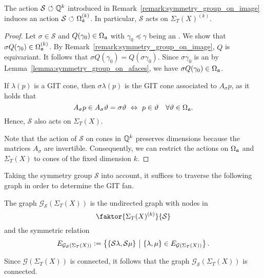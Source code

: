 \begin{prop}
	\label{proposition:symmetry_group_on_orbit_cones}
	The action $\mathcal{S}{\ \circlearrowleft\ }\mathbb{Q}^k$ introduced in Remark~\ref{remark:symmetry_group_on_image} induces an action $\mathcal{S}{\ \circlearrowleft\ }\Omega_{\mathfrak{a}}^{(k)}$. In particular, $\mathcal{S}$ acts on $\Sigma_T(X)^{(k)}$.
\end{prop}
\begin{proof}
	Let $\sigma\in\mathcal{S}$ and $Q(\gamma_0)\in\Omega_{\mathfrak{a}}$ with $\gamma_0\preceq\gamma$ being an \aface{}. We show that $\sigma Q(\gamma_0)\in\Omega_{\mathfrak{a}}^{(k)}$. By Remark~\ref{remark:symmetry_group_on_image}, $Q$ is equivariant. It follows that $\sigma Q(\gamma_0) = Q(\sigma\gamma_0)$. Since $\sigma\gamma_0$ is an \aface{} by Lemma~\ref{lemma:symmetry_group_on_afaces}, we have $\sigma Q(\gamma_0)\in\Omega_{\mathfrak{a}}$.
	
	If $\lambda(p)$ is a GIT cone, then $\sigma \lambda(p)$ is the GIT cone associated to $A_\sigma p$, as it holds that
	$$A_\sigma p \in A_\sigma \vartheta = \sigma \vartheta \ \Leftrightarrow\ p\in \vartheta\quad \forall \vartheta\in\Omega_{\mathfrak{a}}.$$
	Hence, $\mathcal{S}$ also acts on $\Sigma_T(X)$.
	
	Note that the action of $\mathcal{S}$ on cones in $\mathbb{Q}^k$ preserves dimensions because the matrices $A_\sigma$ are invertible. Consequently, we can restrict the actions on $\Omega_{\mathfrak{a}}$ and $\Sigma_T(X)$ to cones of the fixed dimension $k$.
\end{proof}

Taking the symmetry group $\mathcal{S}$ into account, it suffices to traverse the following graph in order to determine the GIT fan.

\begin{defi}
	The graph $\mathcal{G}_\mathcal{S}(\Sigma_T(X))$ is the undirected graph with nodes in
	$$\faktor{\Sigma_T(X)^{(k)}}{\mathcal{S}}$$ 
	and the symmetric relation
	$$E_{\mathcal{G}_\mathcal{S}(\Sigma_T(X))} \mathrel{\mathop:}= \left\{\{\mathcal{S}\lambda, \mathcal{S}\mu\}\ \middle|\ \{\lambda, \mu\} \in  E_{\mathcal{G}(\Sigma_T(X))}\right\}.$$
\end{defi}

\begin{remark}
	Since $\mathcal{G}(\Sigma_T(X))$ is connected, it follows that the graph $\mathcal{G}_\mathcal{S}(\Sigma_T(X))$ is connected.
\end{remark}


